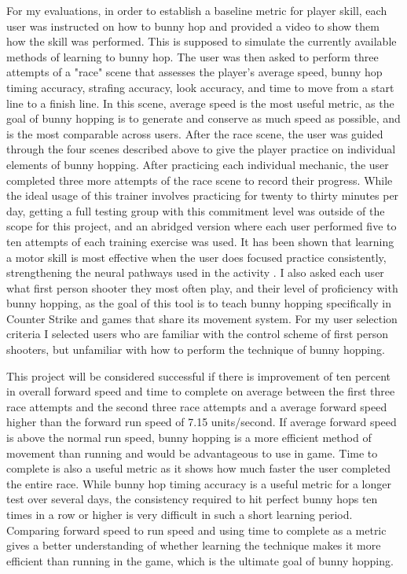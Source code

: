 \documentclass[10pt,twocolumn]{article}
\begin{document}
For my evaluations, in order to establish a baseline metric for player skill, each user was instructed on how to bunny hop and provided a video to show them how the skill was performed. This is supposed to simulate the currently available methods of learning to bunny hop. The user was then asked to perform three attempts of a "race" scene that assesses the player's average speed, bunny hop timing accuracy, strafing accuracy, look accuracy, and time to move from a start line to a finish line. In this scene, average speed is the most useful metric, as the goal of bunny hopping is to generate and conserve as much speed as possible, and is the most comparable across users. After the race scene, the user was guided through the four scenes described above to give the player practice on individual elements of bunny hopping. After practicing each individual mechanic, the user completed three more attempts of the race scene to record their progress. While the ideal usage of this trainer involves practicing for twenty to thirty minutes per day, getting a full testing group with this commitment level was outside of the scope for this project, and an abridged version where each user performed five to ten attempts of each training exercise was used. It has been shown that learning a motor skill is most effective when the user does focused practice consistently, strengthening the neural pathways used in the activity \cite{learningOptimal}. I also asked each user what first person shooter they most often play, and their level of proficiency with bunny hopping, as the goal of this tool is to teach bunny hopping specifically in Counter Strike and games that share its movement system. For my user selection criteria I selected users who are familiar with the control scheme of first person shooters, but unfamiliar with how to perform the technique of bunny hopping. 

This project will be considered successful if there is improvement of ten percent in overall forward speed and time to complete on average between the first three race attempts and the second three race attempts and a average forward speed higher than the forward run speed of 7.15 units/second. If average forward speed is above the normal run speed, bunny hopping is a more efficient method of movement than running and would be advantageous to use in game. Time to complete is also a useful metric as it shows how much faster the user completed the entire race. While bunny hop timing accuracy is a  useful metric for a longer test over several days, the consistency required to hit perfect bunny hops ten times in a row or higher is very difficult in such a short learning period. Comparing forward speed to run speed and using time to complete as a metric gives a better understanding of whether learning the technique makes it more efficient than running in the game, which is the ultimate goal of bunny hopping. 
\end{document}

